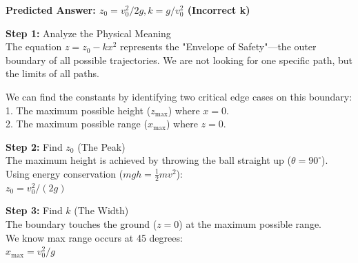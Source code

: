 \begin{minipage}{\linewidth}
\begin{tcolorbox}[
    title={IPhO 2012 Q1},
    colback=white,
    colframe=gray!50!black,
    arc=3pt,
    boxrule=1pt,
    fonttitle=\sffamily\large,
    width=\linewidth
]
\begin{minipage}[t]{0.49\linewidth}
\begin{tcolorbox}
            \textbf{Predicted Answer: $z_0 = v_0^2/2g, k = g/v_0^2$ (Incorrect k)}
        \end{tcolorbox}
    \end{minipage}%
    \hfill
    \begin{minipage}[t]{0.49\linewidth}
        \vspace{0pt}
        \begin{tcolorbox}[
            title={\small \textbf{RL-FINETUNED MODEL}},
            colframe=green!50!black,
            colback=green!5!white,
            coltitle=white,
            fontupper=\small\ttfamily\raggedright,
            boxrule=0.5pt,
            sharp corners,
            left=2pt, right=2pt,
            width=\linewidth,
            nobeforeafter
        ]
            \textbf{\textcolor{green!40!black}{Step 1:}} Analyze the Physical Meaning\\
            The equation $z = z_0 - k x^2$ represents the "Envelope of Safety"—the outer boundary of all possible trajectories. We are not looking for one specific path, but the limits of all paths.
            \vspace{0.5em}
            
            We can find the constants by identifying two critical edge cases on this boundary:\\
            1. The maximum possible height ($z_{\max}$) where $x = 0$.\\
            2. The maximum possible range ($x_{\max}$) where $z = 0$.
            \vspace{1em}
            
            \textbf{\textcolor{green!40!black}{Step 2:}} Find $z_0$ (The Peak)\\
            The maximum height is achieved by throwing the ball straight up ($\theta = 90^\circ$).\\
            Using energy conservation ($mgh = \frac{1}{2} mv^2$):\\
            $z_0 = v_0^2 / (2g)$
            \vspace{1em}
            
            \textbf{\textcolor{green!40!black}{Step 3:}} Find $k$ (The Width)\\
            The boundary touches the ground ($z = 0$) at the maximum possible range.\\
            We know max range occurs at 45 degrees:\\
            $x_{\max} = v_0^2 / g$
            \vspace{0.5em}
            

\end{tcolorbox}
\end{minipage}
\end{tcolorbox}
\end{minipage}
